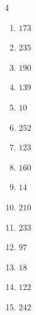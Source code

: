 \begin{multicols}{4}
\begin{enumerate}

  \item $173$


  \item $235$


  \item $190$


  \item $139$


  \item $10$


  \item $252$


  \item $123$


  \item $160$


  \item $14$


  \item $210$


  \item $233$


  \item $97$


  \item $18$


\columnbreak %

  \item $122$


  \item $242$



\end{enumerate}
\end{multicols}
